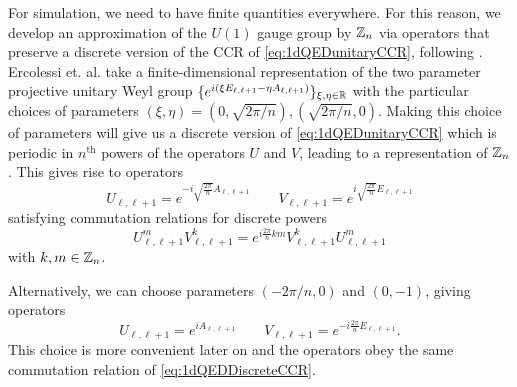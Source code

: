 \documentclass[11pt,reqno]{amsart}
\begin{document}
	For simulation, we need to have finite quantities everywhere. 
	For this reason, we develop an approximation of the $U(1)$ gauge group by $\mathbb{Z}_n$ via operators that preserve a discrete version of the CCR of \cref{eq:1dQEDunitaryCCR}, following \cite{Ercolessi18}.
	Ercolessi et. al. take a finite-dimensional representation of the two parameter projective unitary Weyl group $\{e^{i(\xi E_{\ell,\ell+1}-\eta A_{\ell,\ell+1})}\}_{\xi,\eta \in \mathbb{R}}$ with the particular choices of parameters
	$(\xi,\eta)=(0,\sqrt{2\pi/n}),(\sqrt{2\pi/n},0)$.
	Making this choice of parameters will give us a discrete version of \cref{eq:1dQEDunitaryCCR} which is periodic in $n^\text{th}$ powers of the operators $U$ and $V$, leading to a representation of $\mathbb{Z}_n$.
	This gives rise to operators
	\begin{equation}\label{eq:1dQED_UVEA_Relations}
		U_{\ell,\ell+1} = e^{-i\sqrt{\frac{2\pi}{n}}A_{\ell,\ell+1}} \qquad V_{\ell,\ell+1} = e^{i\sqrt{\frac{2\pi}{n}}E_{\ell,\ell+1}}
	\end{equation}
	satisfying commutation relations for discrete powers
	\begin{equation}\label{eq:1dQEDDiscreteCCR}
		U_{\ell,\ell+1}^m V_{\ell,\ell+1}^k = e^{i\frac{2\pi}{n} k m} V_{\ell,\ell+1}^k U_{\ell,\ell+1}^m
	\end{equation}
	with $k,m \in \mathbb{Z}_n$.
	
	Alternatively, we can choose parameters $(-2\pi /n,0)$ and $(0,-1)$, giving operators
	\begin{equation}\label{eq:1dQED_better_UVEA_Relations}
		U_{\ell,\ell+1} = e^{iA_{\ell,\ell+1}} \qquad V_{\ell,\ell+1} = e^{-i\frac{2\pi}{n} E_{\ell,\ell+1}}.
	\end{equation}
	This choice is more convenient later on and the operators obey the same commutation relation of \cref{eq:1dQEDDiscreteCCR}.
	
\end{document}
